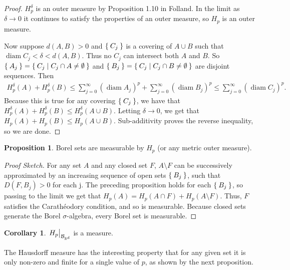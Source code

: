 \documentclass[11pt]{amsart}
\theoremstyle{definition}
\newtheorem{prop}[definition]{Proposition}
\newtheorem{cor}[definition]{Corollary}
\newcommand{\R}{\ensuremath{\mathbb{R}}}
\newcommand{\B}{\ensuremath{\mathcal{B}}}
\DeclareMathOperator{\diam}{diam}
\begin{document}
\begin{proof}
	\(H_p^\delta\) is an outer measure by Proposition 1.10 in Folland. In the limit as \( \delta \rightarrow 0 \) it continues to satisfy the properties of an outer measure, so \( H_p \) is an outer measure. 
	
	Now suppose \( d(A, B) > 0\) and \( \Set{C_j} \) is a covering of \( A \cup B \) such that \(\diam C_j < \delta < d(A, B) \). Thus no \( C_j \) can intersect both \(A\) and \(B\). So \( \Set{A_j} = \Set{C_j | C_j \cap A \neq \emptyset } \) and \( \Set{B_j} = \Set{C_j | C_j \cap B \neq \emptyset } \) are disjoint sequences. Then 
	\begin{align}
		H_p^\delta(A) + H_p^\delta(B) 
		\leq \sum_{j = 0}^\infty (\diam A_j)^p + \sum_{j = 0}^\infty (\diam B_j)^p
		\leq \sum_{j = 0}^\infty (\diam C_j)^p .
	\end{align}
	Because this is true for any covering \( \Set{C_j} \), we have that \(H_p^\delta(A) + H_p^\delta(B) \leq H_p^\delta(A \cup B) \). Letting \( \delta \rightarrow 0 \), we get that \( H_p(A) + H_p(B) \leq H_p(A \cup B) \). Sub-additivity proves the reverse inequality, so we are done.
\end{proof}

\begin{prop}\label{prop:borels}
	Borel sets are measurable by \( H_p\) (or any metric outer measure).
\end{prop}

\begin{proof}[Proof Sketch]
	For any set \(A\) and any closed set \(F\), \(A \setminus F\) can be successively approximated by an increasing sequence of open sets \( \Set{B_j} \), such that \( D(F, B_j) > 0 \) for each j.
	The preceding proposition holds for each \(\Set{B_j}\), so passing to the limit we get that \( H_p(A) = H_p(A \cap F) + H_p(A \setminus F) \). Thus, \( F \) satisfies the Carathéodory condition, and so is measurable. 
	Because closed sets generate the Borel \(\sigma\)-algebra, every Borel set is measurable. 
\end{proof}

\begin{cor}\label{prop:borels:cor}
	\( \left. \vphantom{\big|} H_p \right|_ {\B_{\R^d}}\) is a measure. 
\end{cor}

The Hausdorff measure has the interesting property that for any given set it is only non-zero and finite for a single value of \(p\), as shown by the next proposition.
\end{document}
